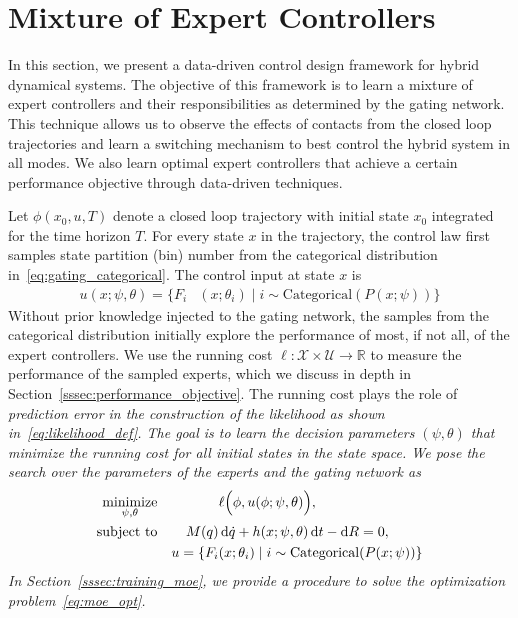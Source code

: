 \section{Mixture of Expert Controllers}
\label{sec:moe_methods}

In this section, we present a data-driven control design framework for hybrid
dynamical systems. 
%
The objective of this framework is to learn a mixture of expert controllers and
their responsibilities as determined by the gating network.
%
This technique allows us to observe the effects of contacts from the closed loop
trajectories  and learn a switching mechanism to best control the hybrid system
in all modes.
%
We also learn optimal expert controllers that achieve a certain performance
objective through data-driven techniques.

%
Let $\phi(x_0, u, T)$ denote a closed loop trajectory with initial state $x_0$
integrated for the time horizon $T$.
%
For every state $x$ in the trajectory, the control law first samples state
partition (bin) number from the categorical distribution
in~\eqref{eq:gating_categorical}.
%
The control input at state $x$ is
\begin{align*}
    u(x; \psi, \theta) = \{F_i&(x; \theta_i) \; | \; i  \sim \text{Categorical} (P(x; \psi)) \}
\end{align*} 
%
Without prior knowledge injected to the gating network, the samples from the
categorical distribution initially explore the performance of most, if not all,
of the expert controllers.
%
We use the running cost $\ell : \mathcal{X} \times \mathcal{U} \rightarrow
\mathbb{R}$ to measure the performance of the sampled experts, which we discuss
in depth in Section~\ref{sssec:performance_objective}.
%
The running cost plays the role of \it{prediction error} \normalfont in the
construction of the likelihood as shown in~\eqref{eq:likelihood_def}.
%
The goal is to learn the decision parameters $(\psi, \theta)$ that minimize the
running cost for all initial states in the state space.
%
We pose the search over the parameters of the experts and the gating network as
\begin{equation}
    \begin{aligned}
        \underset{\psi, \theta}{\textrm{minimize}} 
        & & & \ell \Bigl(\phi,u(\phi; \psi, \theta) \Bigr)  , \\%
        \textrm{subject to}
        & & M(q) &\dd \dot{q} + h(x; \psi, \theta)\dd t - \dd R  = 0,\\%
        & & u = \{F_i&(x; \theta_i) \; | \; i  \sim \text{Categorical} (P(x; \psi)) \}
    \end{aligned}
    \label{eq:moe_opt}
\end{equation}
%
In Section~\ref{sssec:training_moe}, we provide a procedure to solve the
optimization problem~\ref{eq:moe_opt}. 

